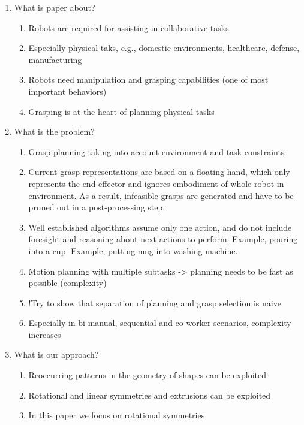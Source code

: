 \documentclass{aamas2015}
\begin{document}
\begin{enumerate}
\item What is paper about?
	\begin{enumerate}
	\item Robots are required for assisting in collaborative tasks
	\item Especially physical taks, e.g., domestic environments, healthcare, 
		  defense, manufacturing 
	\item Robots need manipulation and grasping capabilities (one of most 
		  important behaviors)
	\item Grasping is at the heart of planning physical tasks 
	\end{enumerate}

\item What is the problem?
	\begin{enumerate}
	\item Grasp planning taking into account environment and task constraints
	\item Current grasp representations are based on a floating hand, which only 					  represents the end-effector and ignores embodiment of whole robot in
		  environment. As a result, infeasible grasps are generated and have to be
		  pruned out in a post-processing step. 
	\item Well established algorithms assume only one action, and do not include
		  foresight and reasoning about next actions to perform. Example, pouring
		  into a cup. Example, putting mug into washing machine.
	\item Motion planning with multiple subtasks -> planning needs to be fast 
		  as possible (complexity)
	\item !Try to show that separation of planning and grasp selection is naive
	\item Especially in bi-manual, sequential and co-worker scenarios, complexity increases
	\end{enumerate}
	
\item What is our approach?
	\begin{enumerate}
	\item Reoccurring patterns in the geometry of shapes can be exploited
	\item Rotational and linear symmetries and extrusions can be exploited
	\item In this paper we focus on rotational symmetries
	

\end{enumerate}
\end{enumerate}
\end{document}
